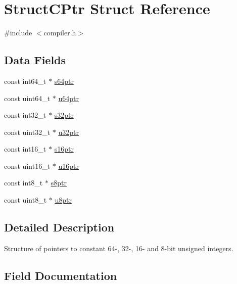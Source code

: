 \hypertarget{struct_struct_c_ptr}{}\section{Struct\+C\+Ptr Struct Reference}
\label{struct_struct_c_ptr}


{\ttfamily \#include $<$compiler.\+h$>$}

\subsection*{Data Fields}
\begin{DoxyCompactItemize}
\item 
const int64\+\_\+t $\ast$ \mbox{\hyperlink{struct_struct_c_ptr_ac9ea294aaa07e5a63204530ebf3dd3d2}{s64ptr}}
\item 
const uint64\+\_\+t $\ast$ \mbox{\hyperlink{struct_struct_c_ptr_abbc67642e882a52be564515f1c8f12cb}{u64ptr}}
\item 
const int32\+\_\+t $\ast$ \mbox{\hyperlink{struct_struct_c_ptr_af6182ebecd1280fa1714762f2d81d5d3}{s32ptr}}
\item 
const uint32\+\_\+t $\ast$ \mbox{\hyperlink{struct_struct_c_ptr_a12f0da0bcf30aca9703630565d8be204}{u32ptr}}
\item 
const int16\+\_\+t $\ast$ \mbox{\hyperlink{struct_struct_c_ptr_a153aa1a4a18fe39a05be056a372d19c9}{s16ptr}}
\item 
const uint16\+\_\+t $\ast$ \mbox{\hyperlink{struct_struct_c_ptr_a4ff05b3b8a78949bf0036fe340b98b05}{u16ptr}}
\item 
const int8\+\_\+t $\ast$ \mbox{\hyperlink{struct_struct_c_ptr_a2e21f1ae56dd4da3f534ccebfa234fcc}{s8ptr}}
\item 
const uint8\+\_\+t $\ast$ \mbox{\hyperlink{struct_struct_c_ptr_acb08e5689c70ca4ef5e0d984f15f47ae}{u8ptr}}
\end{DoxyCompactItemize}


\subsection{Detailed Description}
Structure of pointers to constant 64-\/, 32-\/, 16-\/ and 8-\/bit unsigned integers. 

\subsection{Field Documentation}
\mbox{\label{struct_struct_c_ptr_a153aa1a4a18fe39a05be056a372d19c9}} 
